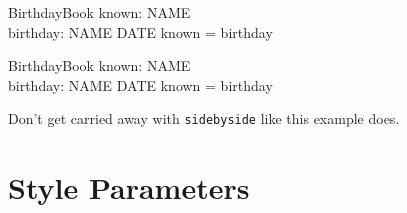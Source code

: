 \documentclass[a4paper]{article}
\begin{document}
 \begin{sidebyside}[3]
 \begin{schema}{BirthdayBook}
     known: \pset NAME \\
     birthday: NAME \pfun DATE
 \ST
     known = \dom birthday
 \end{schema}
 \nextside
 \begin{schema}{BirthdayBook}
     known: \pset NAME \\
     birthday: NAME \pfun DATE
 \ST
     known = \dom birthday
 \end{schema}
 \nextside
 \begin{zpar}
Don't get carried away with \verb|sidebyside|
 like this example does.
 \end{zpar}
 \end{sidebyside}
 
\section{Style Parameters}
\end{document}
